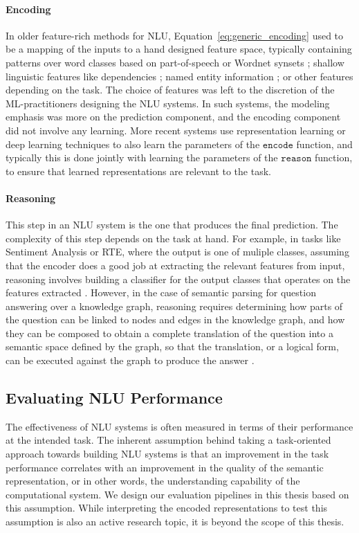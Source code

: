 \paragraph{Encoding} In older feature-rich methods for NLU, 
Equation~\ref{eq:generic_encoding} used to be a mapping of the inputs to a hand designed feature space, typically containing patterns over word classes based on
part-of-speech \citep{corley2005measuring} or Wordnet synsets \citep{moldovan2001logic}; shallow linguistic features like dependencies \citep{bos2005recognising};
named entity information \citep{tatu2005semantic}; or other features depending on the task. The choice of features was left to the discretion of the ML-practitioners
designing the NLU systems. In such systems, the modeling emphasis was more on the prediction component, and the encoding component did not involve any learning. 
More recent systems \citep[among many others]{bahdanau:14,weston2014memory,hermann2015teaching,Xiong2016DynamicMN,bowman2016fast,yang:16} 
use representation learning or deep learning techniques to also learn the parameters of the
$\mathtt{encode}$ function, and typically this is done jointly with learning the parameters of the $\mathtt{reason}$ function, to ensure that learned representations are relevant to the task.

\paragraph{Reasoning} This step in an NLU system is the one that produces the final prediction. The complexity of this step depends on the task at hand.
For example, in tasks like Sentiment Analysis or RTE, where the output is one of muliple classes, assuming that the encoder does a good job at extracting the relevant features from input,
reasoning involves building a classifier for the output classes that operates on the features extracted \citep{pang2002thumbs}. However, in the case of semantic parsing for question answering over a knowledge graph, reasoning requires determining how parts of the question can be linked to
nodes and edges in the knowledge graph, and how they can be composed to obtain a complete translation of the question into a semantic space defined by the graph,
so that the translation, or a logical form, can be executed against the graph to produce the answer \citep{Zettlemoyer2005LearningTM}.

\subsection{Evaluating NLU Performance}
The effectiveness of NLU systems is often measured in terms of their
performance at the intended task. The inherent assumption behind taking a task-oriented approach
towards building NLU systems is that an improvement in the task performance correlates with an improvement in the quality of the semantic representation,
or in other words, the understanding capability of the computational system.
We design our evaluation pipelines in this thesis based on this assumption. While interpreting the encoded
representations to test this assumption is also an active research topic, it is beyond the scope of this thesis.


